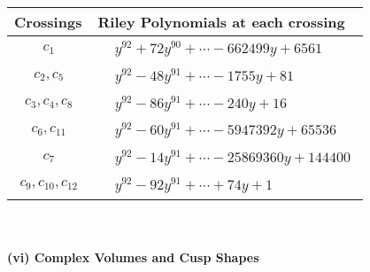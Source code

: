 \documentclass[1p]{elsarticle_modified}
\theoremstyle{definition}
\begin{document}
\begin{tabular}{m{50pt}|m{274pt}}
Crossings & \hspace{64pt}Riley Polynomials at each crossing \\
\hline $$\begin{aligned}c_{1}\end{aligned}$$&$\begin{aligned}
&y^{92}+72 y^{90}+\cdots-662499 y+6561
\end{aligned}$\\
\hline $$\begin{aligned}c_{2},c_{5}\end{aligned}$$&$\begin{aligned}
&y^{92}-48 y^{91}+\cdots-1755 y+81
\end{aligned}$\\
\hline $$\begin{aligned}c_{3},c_{4},c_{8}\end{aligned}$$&$\begin{aligned}
&y^{92}-86 y^{91}+\cdots-240 y+16
\end{aligned}$\\
\hline $$\begin{aligned}c_{6},c_{11}\end{aligned}$$&$\begin{aligned}
&y^{92}-60 y^{91}+\cdots-5947392 y+65536
\end{aligned}$\\
\hline $$\begin{aligned}c_{7}\end{aligned}$$&$\begin{aligned}
&y^{92}-14 y^{91}+\cdots-25869360 y+144400
\end{aligned}$\\
\hline $$\begin{aligned}c_{9},c_{10},c_{12}\end{aligned}$$&$\begin{aligned}
&y^{92}-92 y^{91}+\cdots+74 y+1
\end{aligned}$\\
\hline
\end{tabular}\\~\\
\newpage\flushleft \textbf{(vi) Complex Volumes and Cusp Shapes}
\end{document}
